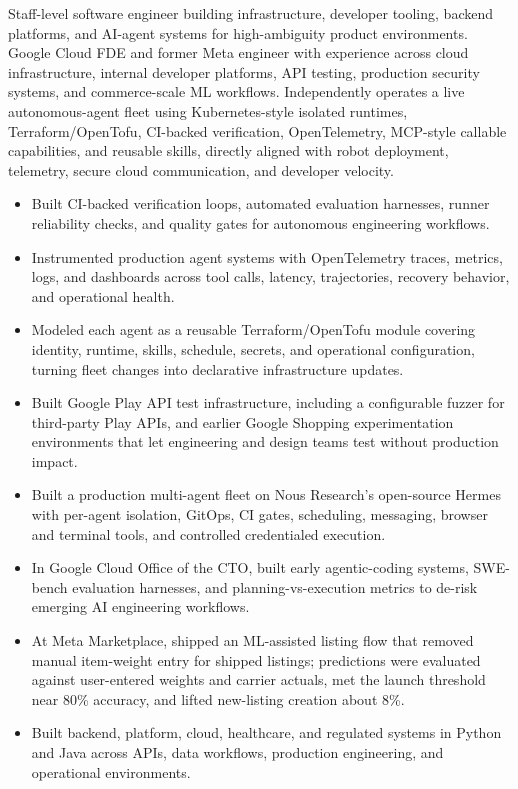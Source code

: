 


Staff-level software engineer building infrastructure, developer tooling, backend platforms, and AI-agent systems for high-ambiguity product environments. Google Cloud FDE and former Meta engineer with experience across cloud infrastructure, internal developer platforms, API testing, production security systems, and commerce-scale ML workflows. Independently operates a live autonomous-agent fleet using Kubernetes-style isolated runtimes, Terraform/OpenTofu, CI-backed verification, OpenTelemetry, MCP-style callable capabilities, and reusable skills, directly aligned with robot deployment, telemetry, secure cloud communication, and developer velocity.
\begin{itemize}
  \item Built CI-backed verification loops, automated evaluation harnesses, runner reliability checks, and quality gates for autonomous engineering workflows.
  \item Instrumented production agent systems with OpenTelemetry traces, metrics, logs, and dashboards across tool calls, latency, trajectories, recovery behavior, and operational health.
  \item Modeled each agent as a reusable Terraform/OpenTofu module covering identity, runtime, skills, schedule, secrets, and operational configuration, turning fleet changes into declarative infrastructure updates.
  \item Built Google Play API test infrastructure, including a configurable fuzzer for third-party Play APIs, and earlier Google Shopping experimentation environments that let engineering and design teams test without production impact.
\end{itemize}
\begin{itemize}
  \item Built a production multi-agent fleet on Nous Research's open-source Hermes with per-agent isolation, GitOps, CI gates, scheduling, messaging, browser and terminal tools, and controlled credentialed execution.
  \item In Google Cloud Office of the CTO, built early agentic-coding systems, SWE-bench evaluation harnesses, and planning-vs-execution metrics to de-risk emerging AI engineering workflows.
  \item At Meta Marketplace, shipped an ML-assisted listing flow that removed manual item-weight entry for shipped listings; predictions were evaluated against user-entered weights and carrier actuals, met the launch threshold near 80\% accuracy, and lifted new-listing creation about 8\%.
  \item Built backend, platform, cloud, healthcare, and regulated systems in Python and Java across APIs, data workflows, production engineering, and operational environments.
\end{itemize}




